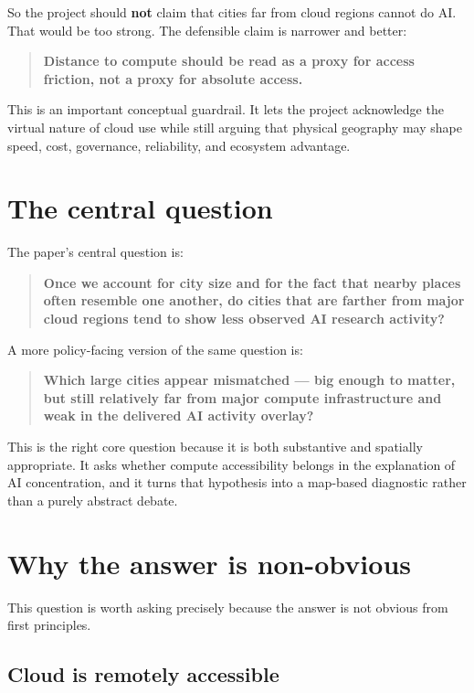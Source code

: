 \documentclass[11pt]{article}
\begin{document}
So the project should \textbf{not} claim that cities far from cloud regions cannot do AI. That would be too strong. The defensible claim is narrower and better:

\begin{quote}
\textbf{Distance to compute should be read as a proxy for access friction, not a proxy for absolute access.}
\end{quote}

This is an important conceptual guardrail. It lets the project acknowledge the virtual nature of cloud use while still arguing that physical geography may shape speed, cost, governance, reliability, and ecosystem advantage.

\section{The central question}

The paper's central question is:

\begin{quote}
\textbf{Once we account for city size and for the fact that nearby places often resemble one another, do cities that are farther from major cloud regions tend to show less observed AI research activity?}
\end{quote}

A more policy-facing version of the same question is:

\begin{quote}
\textbf{Which large cities appear mismatched --- big enough to matter, but still relatively far from major compute infrastructure and weak in the delivered AI activity overlay?}
\end{quote}

This is the right core question because it is both substantive and spatially appropriate. It asks whether compute accessibility belongs in the explanation of AI concentration, and it turns that hypothesis into a map-based diagnostic rather than a purely abstract debate.

\section{Why the answer is non-obvious}

This question is worth asking precisely because the answer is not obvious from first principles.

\subsection{Cloud is remotely accessible}
\end{document}
